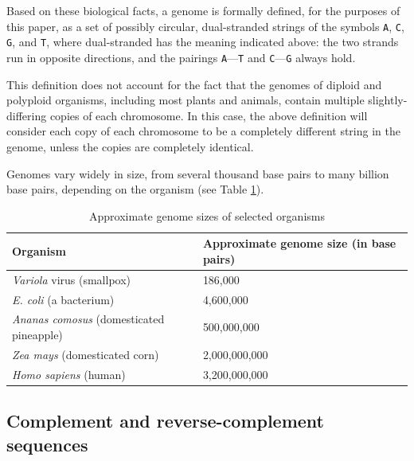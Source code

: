 \documentclass[10pt]{article}
\newcommand\Base[1]{{\tt #1}}
\begin{document}
Based on these biological facts, a genome is formally defined, for the purposes
of this paper, as a set of possibly circular, dual-stranded strings of the
symbols \Base{A}, \Base{C}, \Base{G}, and \Base{T}, where dual-stranded has the
meaning indicated above: the two strands run in opposite directions, and the
pairings \Base{A}---\Base{T} and \Base{C}---\Base{G} always hold.

This definition does not account for the fact that the genomes of diploid and
polyploid organisms, including most plants and animals, contain multiple
slightly-differing copies of each chromosome.  In this case, the above
definition will consider each copy of each chromosome to be a completely
different string in the genome, unless the copies are completely identical.

Genomes vary widely in size, from several thousand base pairs to many billion
base pairs, depending on the organism (see Table \ref{tab:GenomeSizes}).

\begin{table}[H]
	\begin{center}
		\begin{tabular}{|l|p{4.5cm}|}
			\hline
			{\bf Organism} & {\bf Approximate genome size (in base
			pairs)} \\
			\hline
			{\it Variola} virus (smallpox) &  186,000 \\
			\hline
			{\it E. coli} (a bacterium) & 4,600,000 \\
			\hline
			{\it Ananas comosus} (domesticated pineapple) & 500,000,000 \\
			\hline
			{\it Zea mays} (domesticated corn) & 2,000,000,000 \\
			\hline
			{\it Homo sapiens} (human)       &  3,200,000,000 \\
			\hline
		\end{tabular}
	\end{center}
	\caption{Approximate genome sizes of selected organisms}
	\label{tab:GenomeSizes}
\end{table}

\subsection{Complement and reverse-complement sequences}
\end{document}
